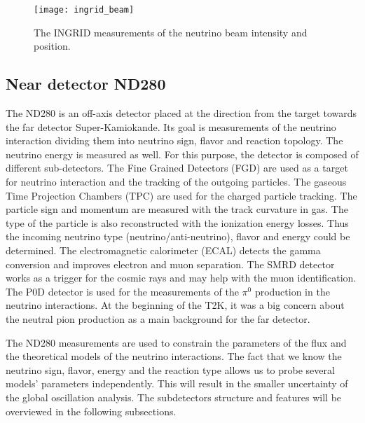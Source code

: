 \documentclass[../main.tex]{subfiles}
\begin{document}
\begin{figure}[!ht]
  \centering
  \texttt{[image: ingrid\_beam]}
  \caption{The INGRID measurements of the neutrino beam intensity and position.}
  \label{fig:t2k:ingrid_beam}
\end{figure}

\subsection{Near detector ND280}
\label{sec:T2K:nd280}
The ND280 is an off-axis detector placed at the direction from the target towards the far detector Super-Kamiokande. Its goal is measurements of the neutrino interaction dividing them into neutrino sign, flavor and reaction topology. The neutrino energy is measured as well. For this purpose, the detector is composed of different sub-detectors. The Fine Grained Detectors (FGD) are used as a target for neutrino interaction and the tracking of the outgoing particles. The gaseous Time Projection Chambers (TPC) are used for the charged particle tracking. The particle sign and momentum are measured with the track curvature in gas. The type of the particle is also reconstructed with the ionization energy losses. Thus the incoming neutrino type (neutrino/anti-neutrino), flavor and energy could be determined. The electromagnetic calorimeter (ECAL) detects the gamma conversion and improves electron and muon separation. The SMRD detector works as a trigger for the cosmic rays and may help with the muon identification. The P0D detector is used for the measurements of the $\pi^0$ production in the neutrino interactions. At the beginning of the T2K, it was a big concern about the neutral pion production as a main background for the far detector.

The ND280 measurements are used to constrain the parameters of the flux and the theoretical models of the neutrino interactions. The fact that we know the neutrino sign, flavor, energy and the reaction type allows us to probe several models' parameters independently. This will result in the smaller uncertainty of the global oscillation analysis. The subdetectors structure and features will be overviewed in the following subsections.
\end{document}
